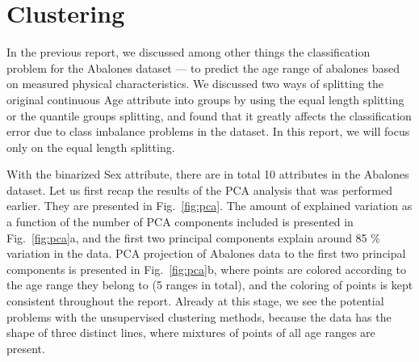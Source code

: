 \documentclass[10pt, paper=a4]{article}
\begin{document}

\section{Clustering}
\label{sec:clustering}
In the previous report, we discussed among other things the classification
problem for the Abalones dataset --- to predict the age range of abalones based
on measured physical characteristics.  We discussed two ways of splitting the
original continuous Age attribute into groups by using the equal length
splitting or the quantile groups splitting, and found that it greatly affects
the classification error due to class imbalance problems in the dataset.  In
this report, we will focus only on the equal length splitting.

With the binarized Sex attribute, there are in total 10 attributes in the
Abalones dataset.  Let us first recap the results of the PCA analysis that was
performed earlier.  They are presented in Fig.~\ref{fig:pca}.  The amount of
explained variation as a function of the number of PCA components included is
presented in Fig.~\ref{fig:pca}a, and the first two principal components explain
around 85 \% variation in the data.  PCA projection of Abalones data to the
first two principal components is presented in Fig.~\ref{fig:pca}b, where points
are colored according to the age range they belong to (5 ranges in total), and
the coloring of points is kept consistent throughout the report.  Already at
this stage, we see the potential problems with the unsupervised clustering
methods, because the data has the shape of three distinct lines, where mixtures
of points of all age ranges are present.
\end{document}
